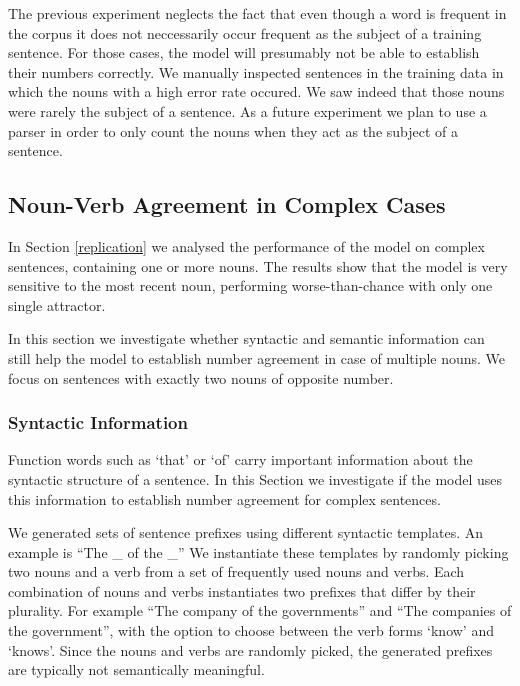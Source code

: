     
The previous experiment neglects the fact that even though a word is frequent in the corpus it does not neccessarily occur frequent as the subject of a training sentence. For those cases, the model will presumably not be able to establish their numbers correctly. We manually inspected sentences in the training data in which
the nouns with a high error rate occured. We saw indeed that those nouns were rarely the subject of a sentence. As a future experiment we plan to use a parser
in order to only count the nouns when they act as the subject of a sentence. 


\subsection{Noun-Verb Agreement in Complex Cases}

In Section \ref{replication} we analysed the performance of the model
on complex sentences, containing one or more 
nouns.
The results show that the model is very
sensitive to the most recent noun,
performing worse-than-chance with only one single attractor.

In this section we investigate whether
syntactic and semantic information
can still help the model 
to establish number agreement
in case of multiple nouns.
We focus on sentences with exactly two nouns
of opposite number.


\subsubsection{Syntactic Information}

Function words such as `that' or `of' carry 
important information about the syntactic structure of a sentence.
In this Section we investigate if the model
uses this information to establish number agreement
for complex sentences.

We generated sets of sentence prefixes using 
different syntactic templates.
An example is ``The \_ of the \_''
We instantiate these templates by randomly
picking two nouns and a verb 
from a set of frequently used nouns and verbs. 
Each combination of nouns and verbs instantiates
two prefixes that differ by their plurality.
For example ``The company of the governments''
and ``The companies of the government'',
with the option to choose between the verb forms
`know' and `knows'.
Since the nouns and verbs are randomly picked,
the generated prefixes 
are typically not semantically
meaningful.

